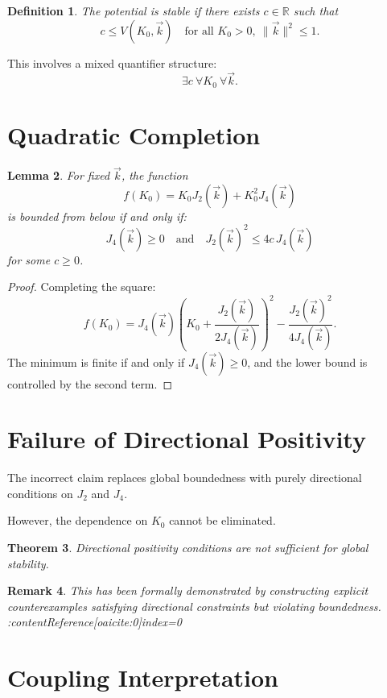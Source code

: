 \documentclass[11pt,a4paper]{article}
\newtheorem{definition}{Definition}[section]
\newtheorem{theorem}[definition]{Theorem}
\newtheorem{lemma}[definition]{Lemma}
\newtheorem{remark}[definition]{Remark}
\begin{document}
	\begin{definition}
		The potential is stable if there exists $c \in \mathbb{R}$ such that
		\[
		c \leq V(K_0,\vec{k})
		\quad \text{for all } K_0 > 0, \ \|\vec{k}\|^2 \leq 1.
		\]
	\end{definition}
	
	This involves a mixed quantifier structure:
	\[
	\exists c \ \forall K_0 \ \forall \vec{k}.
	\]
	
	\section{Quadratic Completion}
	
	\begin{lemma}
		For fixed $\vec{k}$, the function
		\[
		f(K_0) = K_0 J_2(\vec{k}) + K_0^2 J_4(\vec{k})
		\]
		is bounded from below if and only if:
		\[
		J_4(\vec{k}) \geq 0
		\quad \text{and} \quad
		J_2(\vec{k})^2 \leq 4c\,J_4(\vec{k})
		\]
		for some $c \geq 0$.
	\end{lemma}
	
	\begin{proof}
		Completing the square:
		\[
		f(K_0) = J_4(\vec{k})\left(K_0 + \frac{J_2(\vec{k})}{2J_4(\vec{k})}\right)^2 
		- \frac{J_2(\vec{k})^2}{4J_4(\vec{k})}.
		\]
		The minimum is finite if and only if $J_4(\vec{k}) \geq 0$, and the lower bound is controlled by the second term.
	\end{proof}
	
	\section{Failure of Directional Positivity}
	
	The incorrect claim replaces global boundedness with purely directional conditions on $J_2$ and $J_4$.
	
	However, the dependence on $K_0$ cannot be eliminated.
	
	\begin{theorem}
		Directional positivity conditions are not sufficient for global stability.
	\end{theorem}
	
	\begin{remark}
		This has been formally demonstrated by constructing explicit counterexamples satisfying directional constraints but violating boundedness. :contentReference[oaicite:0]{index=0}
	\end{remark}
	
	\section{Coupling Interpretation}
	
\end{document}
